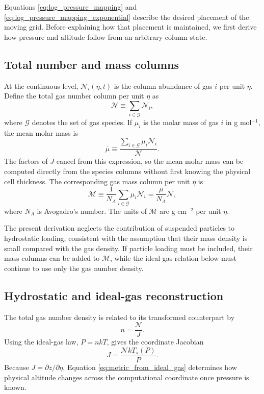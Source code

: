 \documentclass[twocolumn]{aastex631}
\begin{document}
Equations \eqref{eq:log_pressure_mapping} and
\eqref{eq:log_pressure_mapping_exponential} describe the desired placement of
the moving grid. Before explaining how that placement is maintained, we first
derive how pressure and altitude follow from an arbitrary column state.

\subsection{Total number and mass columns}

At the continuous level, $\mathcal{N}_i(\eta,t)$ is the column abundance of
gas $i$ per unit $\eta$. Define the total gas number column per unit $\eta$ as
\begin{equation}
  \mathcal{N}
  \equiv
  \sum_{i\in\mathcal{G}}\mathcal{N}_i,
  \label{eq:total_number_column_eta}
\end{equation}
where $\mathcal{G}$ denotes the set of gas species. If $\mu_i$ is the molar
mass of gas $i$ in g mol$^{-1}$, the mean molar mass is
\begin{equation}
  \overline{\mu}
  \equiv
  \frac{\displaystyle\sum_{i\in\mathcal{G}}
  \mu_i\mathcal{N}_i}
  {\mathcal{N}}.
  \label{eq:mean_molar_mass_eta}
\end{equation}
The factors of $J$ cancel from this expression, so the mean molar mass can be
computed directly from the species columns without first knowing the physical
cell thickness. The corresponding gas mass column per unit $\eta$ is
\begin{equation}
  \mathcal{M}
  \equiv
  \frac{1}{N_A}\sum_{i\in\mathcal{G}}\mu_i\mathcal{N}_i
  =\frac{\overline{\mu}}{N_A}\mathcal{N},
  \label{eq:mass_column_eta}
\end{equation}
where $N_A$ is Avogadro's number. The units of $\mathcal{M}$ are g cm$^{-2}$
per unit $\eta$.

The present derivation neglects the contribution of suspended particles to
hydrostatic loading, consistent with the assumption that their mass density
is small compared with the gas density. If particle loading must be included,
their mass columns can be added to $\mathcal{M}$, while the ideal-gas relation
below must continue to use only the gas number density.

\subsection{Hydrostatic and ideal-gas reconstruction}

The total gas number density is related to its transformed counterpart by
\begin{equation}
  n=\frac{\mathcal{N}}{J}.
  \label{eq:number_density_from_metric}
\end{equation}
Using the ideal-gas law, $P=nkT$, gives the coordinate Jacobian
\begin{equation}
  J
  =\frac{\mathcal{N}kT_\star(P)}{P}.
  \label{eq:metric_from_ideal_gas}
\end{equation}
Because $J=\partial z/\partial\eta$, Equation
\eqref{eq:metric_from_ideal_gas} determines how physical altitude changes
across the computational coordinate once pressure is known.
\end{document}
